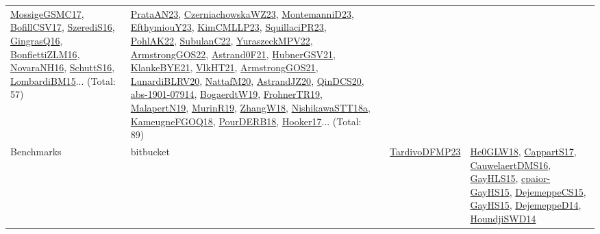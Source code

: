 {\begin{longtable}{lp{3cm}>{\raggedright}p{6cm}>{\raggedright}p{6cm}p{8cm}}
\href{papers/MossigeGSMC17.pdf}{MossigeGSMC17}\cite{MossigeGSMC17}, \href{papers/BofillCSV17.pdf}{BofillCSV17}\cite{BofillCSV17}, \href{papers/SzerediS16.pdf}{SzerediS16}\cite{SzerediS16}, \href{papers/GingrasQ16.pdf}{GingrasQ16}\cite{GingrasQ16}, \href{papers/BonfiettiZLM16.pdf}{BonfiettiZLM16}\cite{BonfiettiZLM16}, \href{articles/NovaraNH16.pdf}{NovaraNH16}\cite{NovaraNH16}, \href{papers/SchuttS16.pdf}{SchuttS16}\cite{SchuttS16}, \href{papers/LombardiBM15.pdf}{LombardiBM15}\cite{LombardiBM15}... (Total: 57) & \href{articles/PrataAN23.pdf}{PrataAN23}\cite{PrataAN23}, \href{articles/CzerniachowskaWZ23.pdf}{CzerniachowskaWZ23}\cite{CzerniachowskaWZ23}, \href{articles/MontemanniD23.pdf}{MontemanniD23}\cite{MontemanniD23}, \href{papers/EfthymiouY23.pdf}{EfthymiouY23}\cite{EfthymiouY23}, \href{papers/KimCMLLP23.pdf}{KimCMLLP23}\cite{KimCMLLP23}, \href{papers/SquillaciPR23.pdf}{SquillaciPR23}\cite{SquillaciPR23}, \href{articles/PohlAK22.pdf}{PohlAK22}\cite{PohlAK22}, \href{articles/SubulanC22.pdf}{SubulanC22}\cite{SubulanC22}, \href{articles/YuraszeckMPV22.pdf}{YuraszeckMPV22}\cite{YuraszeckMPV22}, \href{papers/ArmstrongGOS22.pdf}{ArmstrongGOS22}\cite{ArmstrongGOS22}, \href{papers/Astrand0F21.pdf}{Astrand0F21}\cite{Astrand0F21}, \href{articles/HubnerGSV21.pdf}{HubnerGSV21}\cite{HubnerGSV21}, \href{papers/KlankeBYE21.pdf}{KlankeBYE21}\cite{KlankeBYE21}, \href{articles/VlkHT21.pdf}{VlkHT21}\cite{VlkHT21}, \href{papers/ArmstrongGOS21.pdf}{ArmstrongGOS21}\cite{ArmstrongGOS21}, \href{articles/LunardiBLRV20.pdf}{LunardiBLRV20}\cite{LunardiBLRV20}, \href{papers/NattafM20.pdf}{NattafM20}\cite{NattafM20}, \href{articles/AstrandJZ20.pdf}{AstrandJZ20}\cite{AstrandJZ20}, \href{articles/QinDCS20.pdf}{QinDCS20}\cite{QinDCS20}, \href{articles/abs-1901-07914.pdf}{abs-1901-07914}\cite{abs-1901-07914}, \href{papers/BogaerdtW19.pdf}{BogaerdtW19}\cite{BogaerdtW19}, \href{papers/FrohnerTR19.pdf}{FrohnerTR19}\cite{FrohnerTR19}, \href{papers/MalapertN19.pdf}{MalapertN19}\cite{MalapertN19}, \href{papers/MurinR19.pdf}{MurinR19}\cite{MurinR19}, \href{articles/ZhangW18.pdf}{ZhangW18}\cite{ZhangW18}, \href{papers/NishikawaSTT18a.pdf}{NishikawaSTT18a}\cite{NishikawaSTT18a}, \href{papers/KameugneFGOQ18.pdf}{KameugneFGOQ18}\cite{KameugneFGOQ18}, \href{articles/PourDERB18.pdf}{PourDERB18}\cite{PourDERB18}, \href{papers/Hooker17.pdf}{Hooker17}\cite{Hooker17}... (Total: 89)\\
Benchmarks & bitbucket &  & \href{papers/TardivoDFMP23.pdf}{TardivoDFMP23}\cite{TardivoDFMP23} & \href{papers/He0GLW18.pdf}{He0GLW18}\cite{He0GLW18}, \href{papers/CappartS17.pdf}{CappartS17}\cite{CappartS17}, \href{papers/CauwelaertDMS16.pdf}{CauwelaertDMS16}\cite{CauwelaertDMS16}, \href{papers/GayHLS15.pdf}{GayHLS15}\cite{GayHLS15}, \href{papers/cpaior-GayHS15.pdf}{cpaior-GayHS15}\cite{cpaior-GayHS15}, \href{papers/DejemeppeCS15.pdf}{DejemeppeCS15}\cite{DejemeppeCS15}, \href{papers/GayHS15.pdf}{GayHS15}\cite{GayHS15}, \href{papers/DejemeppeD14.pdf}{DejemeppeD14}\cite{DejemeppeD14}, \href{papers/HoundjiSWD14.pdf}{HoundjiSWD14}\cite{HoundjiSWD14}\\

\end{longtable}}
